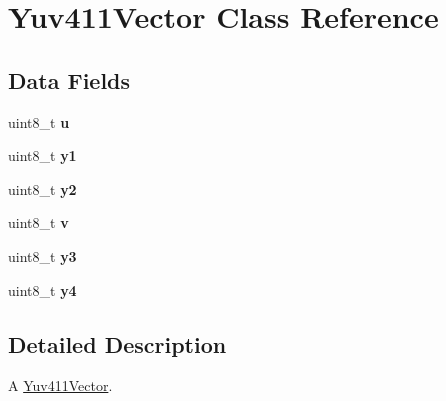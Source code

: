 \hypertarget{classPlayer_1_1Yuv411Vector}{}\section{Yuv411\+Vector Class Reference}
\label{classPlayer_1_1Yuv411Vector}
\subsection*{Data Fields}
\begin{DoxyCompactItemize}
\item 
\hypertarget{classPlayer_1_1Yuv411Vector_a02ae6f520370d7aaa739c73180f091b2}{}uint8\+\_\+t {\bfseries u}\label{classPlayer_1_1Yuv411Vector_a02ae6f520370d7aaa739c73180f091b2}

\item 
\hypertarget{classPlayer_1_1Yuv411Vector_af2a4bde7e1b01cf2f420295ee22cf94f}{}uint8\+\_\+t {\bfseries y1}\label{classPlayer_1_1Yuv411Vector_af2a4bde7e1b01cf2f420295ee22cf94f}

\item 
\hypertarget{classPlayer_1_1Yuv411Vector_ab46d53655890336d982ec8600a4c5f65}{}uint8\+\_\+t {\bfseries y2}\label{classPlayer_1_1Yuv411Vector_ab46d53655890336d982ec8600a4c5f65}

\item 
\hypertarget{classPlayer_1_1Yuv411Vector_a467db8c58dd86cf7c97848f9fc85a4c8}{}uint8\+\_\+t {\bfseries v}\label{classPlayer_1_1Yuv411Vector_a467db8c58dd86cf7c97848f9fc85a4c8}

\item 
\hypertarget{classPlayer_1_1Yuv411Vector_a7f30cd571b8069087b6f2477bdfbc24a}{}uint8\+\_\+t {\bfseries y3}\label{classPlayer_1_1Yuv411Vector_a7f30cd571b8069087b6f2477bdfbc24a}

\item 
\hypertarget{classPlayer_1_1Yuv411Vector_a028d192d7e544c837a59835942f67b33}{}uint8\+\_\+t {\bfseries y4}\label{classPlayer_1_1Yuv411Vector_a028d192d7e544c837a59835942f67b33}

\end{DoxyCompactItemize}


\subsection{Detailed Description}
A \hyperlink{classPlayer_1_1Yuv411Vector}{Yuv411\+Vector}. 